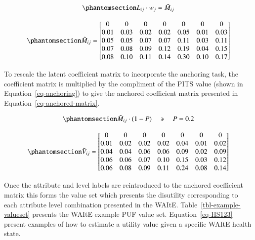 \documentclass[
  number,
  preprint]{elsarticle}
\begin{document}
\begin{equation}\phantomsection\label{eq-element-wise-multiplication}{
    L_{ij} \cdot  w_{j} = {\tilde{M}}_{ij}
}\end{equation}

\begin{equation}\phantomsection\label{eq-coeff-matrix}{
\tilde{M}_{ij} =  
\begin{bmatrix}
0 & 0 & 0 & 0 & 0 & 0 & 0 \\
0.01 & 0.03 & 0.02 & 0.02 & 0.05 & 0.01 & 0.03 \\
0.05 & 0.05 & 0.07 & 0.07 & 0.11 & 0.03 & 0.11 \\
0.07 & 0.08 & 0.09 & 0.12 & 0.19 & 0.04 & 0.15 \\
0.08 & 0.10 & 0.11 & 0.14 & 0.30 & 0.10 & 0.17
\end{bmatrix}
}\end{equation}

To rescale the latent coefficient matrix to incorporate the anchoring
task, the coefficient matrix is multiplied by the compliment of the PITS
value (shown in Equation~\ref{eq-anchoring}) to give the anchored
coefficient matrix presented in Equation~\ref{eq-anchored-matrix}.

\begin{equation}\phantomsection\label{eq-anchoring}{
    \tilde{M}_{ij} \cdot (1-P) \quad \backepsilon \quad P = 0.2 
}\end{equation}

\begin{equation}\phantomsection\label{eq-anchored-matrix}{
\tilde{V}_{ij} =  
\begin{bmatrix}
0 & 0 & 0 & 0 & 0 & 0 & 0 \\
0.01 & 0.02 & 0.02 & 0.02 & 0.04 & 0.01 & 0.02 \\
0.04 & 0.04 & 0.06 & 0.06 & 0.09 & 0.02 & 0.09 \\
0.06 & 0.06 & 0.07 & 0.10 & 0.15 & 0.03 & 0.12 \\
0.06 & 0.08 & 0.09 & 0.11 & 0.24 & 0.08 & 0.14 \\
\end{bmatrix}
}\end{equation}

Once the attribute and level labels are reintroduced to the anchored
coefficient matrix this forms the value set which presents the
disutility corresponding to each attribute level combination presented
in the WAItE. Table~\ref{tbl-example-valueset} presents the WAItE
example PUF value set. Equation~\ref{eq-HS123} present examples of how
to estimate a utility value given a specific WAItE health state.
\end{document}
